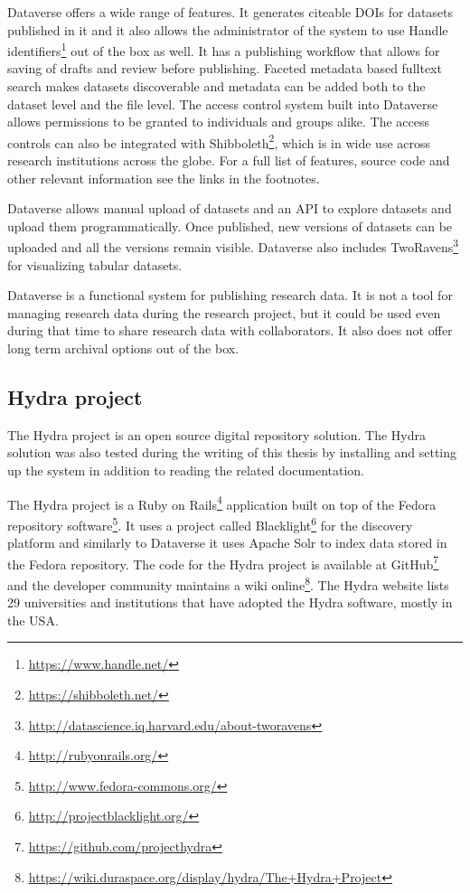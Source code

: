 Dataverse offers a wide range of features. It generates citeable DOIs for
datasets published in it and it also allows the administrator of the system
to use Handle identifiers\footnote{\url{https://www.handle.net/}} out of the
box as well. It has a publishing workflow that allows for saving of drafts and
review before publishing. Faceted metadata based fulltext search makes datasets
discoverable and metadata can be added both to the dataset level and the file
level. The access control system built into Dataverse allows permissions to be
granted to individuals and groups alike. The access controls can also be
integrated with Shibboleth\footnote{\url{https://shibboleth.net/}}, which is in
wide use across research institutions across the globe. For a full list of
features, source code and other relevant information see the links in the
footnotes.

Dataverse allows manual upload of datasets and an API to explore datasets
and upload them programmatically. Once published, new versions of datasets
can be uploaded and all the versions remain visible. Dataverse also includes
TwoRavens\footnote{\url{http://datascience.iq.harvard.edu/about-tworavens}}
for visualizing tabular datasets.

Dataverse is a functional system for publishing research data. It is not a tool
for managing research data during the research project, but it could be used
even during that time to share research data with collaborators. It also does
not offer long term archival options out of the box.

\subsection{Hydra project}

The Hydra project is an open source digital repository solution. The Hydra
solution was also tested during the writing of this thesis by installing and
setting up the system in addition to reading the related documentation.

The Hydra project is a Ruby on Rails\footnote{\url{http://rubyonrails.org/}}
application built on top of the Fedora repository software\footnote{\url{http://www.fedora-commons.org/}}.
It uses a project called Blacklight\footnote{\url{http://projectblacklight.org/}}
for the discovery platform and similarly to Dataverse it uses Apache Solr to
index data stored in the Fedora repository. The code for the Hydra project is
available at GitHub\footnote{\url{https://github.com/projecthydra}} and the
developer community maintains a wiki online\footnote{\url{https://wiki.duraspace.org/display/hydra/The+Hydra+Project}}. The Hydra website lists 29 universities and institutions that have
adopted the Hydra software, mostly in the USA.

